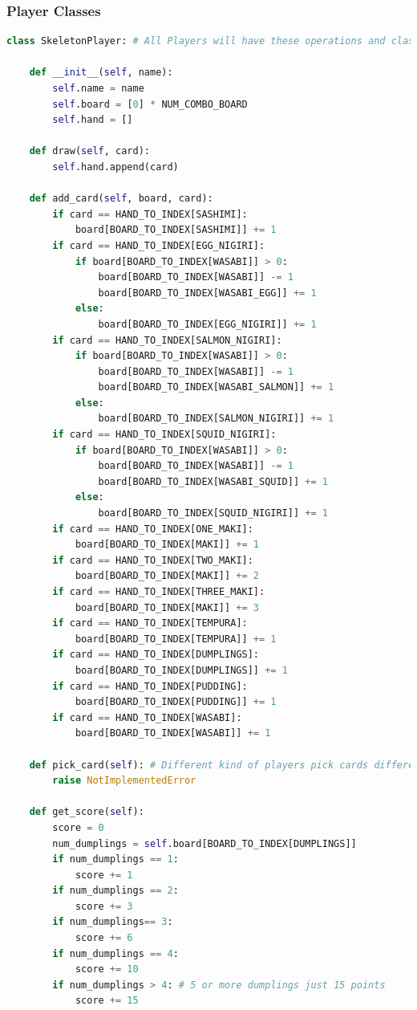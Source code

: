 \hypertarget{player-classes}{%
\subsubsection{Player Classes}\label{player-classes}}

\begin{lstlisting}[language=Python]
class SkeletonPlayer: # All Players will have these operations and class fields

    def __init__(self, name):
        self.name = name
        self.board = [0] * NUM_COMBO_BOARD
        self.hand = []

    def draw(self, card):
        self.hand.append(card)
    
    def add_card(self, board, card):
        if card == HAND_TO_INDEX[SASHIMI]:
            board[BOARD_TO_INDEX[SASHIMI]] += 1
        if card == HAND_TO_INDEX[EGG_NIGIRI]:
            if board[BOARD_TO_INDEX[WASABI]] > 0:
                board[BOARD_TO_INDEX[WASABI]] -= 1
                board[BOARD_TO_INDEX[WASABI_EGG]] += 1 
            else:
                board[BOARD_TO_INDEX[EGG_NIGIRI]] += 1
        if card == HAND_TO_INDEX[SALMON_NIGIRI]:
            if board[BOARD_TO_INDEX[WASABI]] > 0:
                board[BOARD_TO_INDEX[WASABI]] -= 1
                board[BOARD_TO_INDEX[WASABI_SALMON]] += 1 
            else:
                board[BOARD_TO_INDEX[SALMON_NIGIRI]] += 1
        if card == HAND_TO_INDEX[SQUID_NIGIRI]:
            if board[BOARD_TO_INDEX[WASABI]] > 0:
                board[BOARD_TO_INDEX[WASABI]] -= 1
                board[BOARD_TO_INDEX[WASABI_SQUID]] += 1 
            else:
                board[BOARD_TO_INDEX[SQUID_NIGIRI]] += 1
        if card == HAND_TO_INDEX[ONE_MAKI]:
            board[BOARD_TO_INDEX[MAKI]] += 1
        if card == HAND_TO_INDEX[TWO_MAKI]:
            board[BOARD_TO_INDEX[MAKI]] += 2
        if card == HAND_TO_INDEX[THREE_MAKI]:
            board[BOARD_TO_INDEX[MAKI]] += 3
        if card == HAND_TO_INDEX[TEMPURA]:
            board[BOARD_TO_INDEX[TEMPURA]] += 1
        if card == HAND_TO_INDEX[DUMPLINGS]:
            board[BOARD_TO_INDEX[DUMPLINGS]] += 1
        if card == HAND_TO_INDEX[PUDDING]:
            board[BOARD_TO_INDEX[PUDDING]] += 1
        if card == HAND_TO_INDEX[WASABI]:
            board[BOARD_TO_INDEX[WASABI]] += 1

    def pick_card(self): # Different kind of players pick cards differently
        raise NotImplementedError

    def get_score(self):
        score = 0
        num_dumplings = self.board[BOARD_TO_INDEX[DUMPLINGS]]
        if num_dumplings == 1:
            score += 1
        if num_dumplings == 2:
            score += 3
        if num_dumplings== 3:
            score += 6
        if num_dumplings == 4:
            score += 10
        if num_dumplings > 4: # 5 or more dumplings just 15 points
            score += 15
        

\end{lstlisting}
